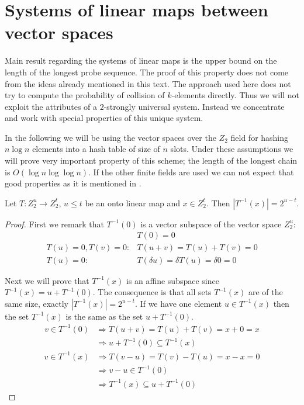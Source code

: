 \chapter{Systems of linear maps between vector spaces}

Main result regarding the systems of linear maps is the upper bound on the length of the longest probe sequence. The proof of this property does not come from the ideas already mentioned in this text. The approach used here does not try to compute the probability of collision of $k$-elements directly. Thus we will not exploit the attributes of a $2$-strongly universal system. Instead we concentrate and work with special properties of this unique system.

In the following we will be using the vector spaces over the $Z_2$ field for hashing $n \log n$ elements into a hash table of size of $n$ slots. Under these assumptions we will prove very important property of this scheme; the length of the longest chain is $O(\log n \log \log n)$. If the other finite fields are used we can not expect that good properties as it is mentioned in \cite{linear-hash-functions}.

\begin{lemma}
\label{lemma-linear-transformation-domain-distribution}
Let $T: Z_2^u \rightarrow Z_2^t$, $u \leq t$ be an onto linear map and $x \in Z_2^t$. Then $|T^{-1}(x)| = 2 ^ {u-t}$.
\end{lemma}
\begin{proof}
First we remark that $T^{-1}(0)$ is a vector subspace of the vector space $Z_2^u$:
\begin{displaymath}
\begin{split}
& T(0) = 0 \\
T(u) = 0, T(v) = 0: & T(u + v) = T(u) + T(v) = 0 \\
T(u) = 0: & T(\delta u) = \delta T(u) = \delta 0 = 0
\end{split}
\end{displaymath}

Next we will prove that $T^{-1}(x)$ is an affine subspace since $T^{-1}(x) = u + T^{-1}(0)$. The consequence is that all sets $T^{-1}(x)$ are of the same size, exactly $|T^{-1}(x)| = 2^{u-t}$. If we have one element $u \in T^{-1}(x)$ then the set $T^{-1}(x)$ is the same as the set $u + T^{-1}(0)$.
\begin{displaymath}
\begin{split}
v \in T^{-1}(0) 
	& \Rightarrow T(u+v) = T(u) + T(v) = x + 0 = x  \\
	& \Rightarrow u + T^{-1}(0) \subseteq T^{-1}(x)
\end{split}
\end{displaymath}
\begin{displaymath}
\begin{split}
v \in T^{-1}(x) 
	& \Rightarrow T(v-u) = T(v) - T(u) = x - x = 0 \\
	& \Rightarrow v - u \in T^{-1}(0) \\
	& \Rightarrow T^{-1}(x) \subseteq u + T^{-1}(0)
\end{split}
\end{displaymath}
\end{proof}

